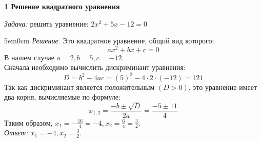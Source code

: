 \documentclass[12pt]{article}
\begin{document}
\textbf{{\Large 1    Решение квадратного уравнения}}

\textit{Задача:} решить уравнение: $2x^{2}+5x-12=0$
\begin{adjustwidth}{5em}{0cm}
  \textit{Решение.} Это квадратное уравнение, общий вид которого:
  $$ax^{2}+bx+c=0$$
  В нашем случае $a = 2, b = 5, c = -12$. \\
  Сначала необходимо вычислить дискриминант уравнения:
  $$D = b^{2}-4ac=(5)^{2} - 4 \cdot 2 \cdot (-12) = 121$$
  Так как дискриминант является положительным $(D>0)$, это уравнение имеет два корня, вычисляемые по формуле:
  $$x_{1,2}= \frac{-b \pm \sqrt{D}}{2a} = \frac{-5 \pm 11}{4}$$
  Таким образом, $x_{1} = -\frac{16}{4} = -4, x_{2} = \frac{6}{4} = \frac{3}{2}$. \\
  \textit{Ответ:} $\displaystyle x_{1} = -4, x_{2} = \frac{3}{2}.$
\end{adjustwidth}
\end{document}
